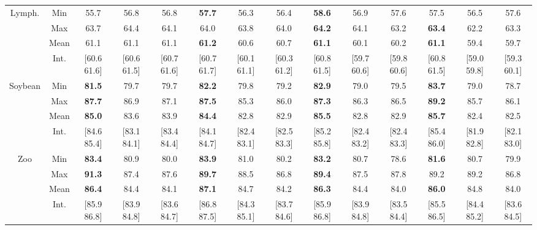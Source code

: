 \documentclass[10pt]{article}
\begin{document}
\begin{Table}
{\begin{tabular}{|c|c|ccc|ccc|ccc|ccc|}
\\
\cline{1-14}
\multirow{4}{1.6cm}{Lymph.}
&Min
 &55.7 &56.8 &56.8  %
 &{\bfseries 57.7} &56.3 &56.4  %
 &{\bfseries 58.6} &56.9 &57.6  %
 &57.5 &56.5 &57.6  %
\\
&Max
 &63.7 &64.4 &64.1  %
 &64.0 &63.8 &64.0  %
 &{\bfseries 64.2} &64.1 &63.2  %
 &{\bfseries 63.4} &62.2 &63.3  %
\\
&Mean
 &61.1 &61.1 &61.1  %
 &{\bfseries 61.2} &60.6 &60.7  %
 &{\bfseries 61.1} &60.1 &60.2  %
 &{\bfseries 61.1} &59.4 &59.7  %
\\
&Int.
 &[60.6 61.6] &[60.6 61.5] &[60.7 61.6]  %
 &[60.7 61.7] &[60.1 61.1] &[60.3 61.2]  %
 &[60.8 61.5] &[59.7 60.6] &[59.8 60.6]  %
 &[60.8 61.5] &[59.0 59.8] &[59.3 60.1]  %
\\
\cline{1-14}
\multirow{4}{1.6cm}{Soybean}
&Min
 &{\bfseries 81.5} &79.7 &79.7  %
 &{\bfseries 82.2} &79.8 &79.2  %
 &{\bfseries 82.9} &79.0 &79.5  %
 &{\bfseries 83.7} &79.0 &78.7  %
\\
&Max
 &{\bfseries 87.7} &86.9 &87.1  %
 &{\bfseries 87.5} &85.3 &86.0  %
 &{\bfseries 87.3} &86.3 &86.5  %
 &{\bfseries 89.2} &85.7 &86.1  %
\\
&Mean
 &{\bfseries 85.0} &83.6 &83.9  %
 &{\bfseries 84.4} &82.8 &82.9  %
 &{\bfseries 85.5} &82.8 &82.9  %
 &{\bfseries 85.7} &82.4 &82.5  %
\\
&Int.
 &[84.6 85.4] &[83.1 84.1] &[83.4 84.4]  %
 &[84.1 84.7] &[82.4 83.1] &[82.5 83.3]  %
 &[85.2 85.8] &[82.4 83.2] &[82.4 83.3]  %
 &[85.4 86.0] &[81.9 82.8] &[82.1 83.0]  %
\\
\cline{1-14}
\multirow{4}{1.6cm}{Zoo}
&Min
 &{\bfseries 83.4} &80.9 &80.0  %
 &{\bfseries 83.9} &81.0 &80.2  %
 &{\bfseries 83.2} &80.7 &78.6  %
 &{\bfseries 81.6} &80.7 &79.9  %
\\
&Max
 &{\bfseries 91.3} &87.4 &87.6  %
 &{\bfseries 89.7} &88.5 &86.8  %
 &{\bfseries 89.4} &87.5 &87.8  %
 &89.2 &89.2 &86.8  %
\\
&Mean
 &{\bfseries 86.4} &84.4 &84.1  %
 &{\bfseries 87.1} &84.7 &84.2  %
 &{\bfseries 86.3} &84.4 &84.0  %
 &{\bfseries 86.0} &84.8 &84.0  %
\\
&Int.
 &[85.9 86.8] &[83.9 84.8] &[83.6 84.7]  %
 &[86.8 87.5] &[84.3 85.1] &[83.7 84.6]  %
 &[85.9 86.8] &[83.9 84.8] &[83.5 84.4]  %
 &[85.5 86.5] &[84.4 85.2] &[83.6 84.5]  %
\\
\cline{1-14}
\hline
\end{tabular}
}
\end{Table}
\end{document}
